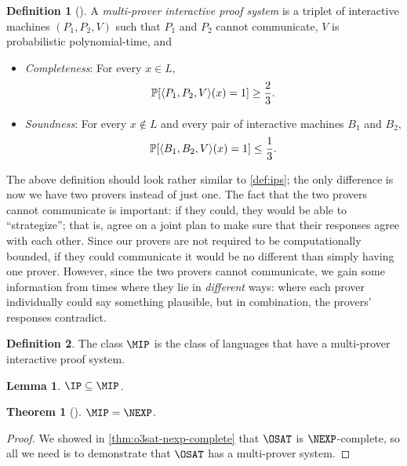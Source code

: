 \documentclass[english]{reedthesis}
\theoremstyle{plain}
\newtheorem{thm}{Theorem}[section]
\newtheorem{lemma}[lemma]{Lemma}
\theoremstyle{definition}
\newtheorem{defn}[defn]{Definition}
\theoremstyle{remark}
\DeclarePairedDelimiter{\ang}{\langle}{\rangle}
\begin{document}
\begin{defn}[{\cite[Def.\ 4.11.2]{Go01}}]\label{def:mps}
  A \emph{multi-prover interactive proof system} is a triplet of interactive
  machines $(P_{1}, P_{2}, V)$ such that $P_{1}$ and $P_{2}$ cannot communicate,
  $V$ is probabilistic polynomial-time, and
  \begin{itemize}
    \item \emph{Completeness}: For every $x \in L$,
          \[
            \mathbb{P}[\ang{P_{1}, P_{2}, V}(x) = 1] \ge \frac{2}{3}.
          \]
    \item \emph{Soundness}: For every $x \notin L$ and every pair of interactive
          machines $B_{1}$ and $B_{2}$,
          \[
            \mathbb{P}[\ang{B_{1}, B_{2}, V}(x) = 1] \le \frac{1}{3}.
          \]
  \end{itemize}
\end{defn}

The above definition should look rather similar to \cref{def:ips}; the only
difference is now we have two provers instead of just one. The fact that the two
provers cannot communicate is important: if they could, they would be able to
``strategize''; that is, agree on a joint plan to make sure that their responses
agree with each other. Since our provers are not required to be computationally
bounded, if they could communicate it would be no different than simply having
one prover. However, since the two provers cannot communicate, we gain some
information from times where they lie in \emph{different} ways: where each
prover individually could say something plausible, but in combination, the
provers' responses contradict.

\begin{defn}\label{def:mip}
  The class $\MIP$ is the class of languages that have a multi-prover
  interactive proof system.
\end{defn}

\begin{lemma}\label{lem:ip-in-mip}
  $\IP \subseteq \MIP$.
\end{lemma}

\begin{thm}[{\cite{BFL90}}]\label{thm:mip-is-nexp}
  $\MIP = \NEXP$.
\end{thm}

\begin{proof}
  We showed in \cref{thm:o3sat-nexp-complete} that $\OSAT$ is $\NEXP$-complete,
  so all we need is to demonstrate that $\OSAT$ has a multi-prover system.
\end{proof}
\end{document}
